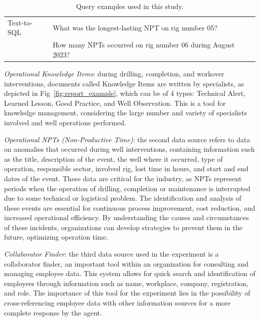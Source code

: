 \begin{table}[h]
\begin{tabular}{|p{2cm}|l|}
                    Text-to-SQL & What was the longest-lasting NPT on rig number 05? \\ 
                    & How many NPTs occurred on rig number 06 during August 2023? \\ 
                    \hline
                \end{tabular}
                \fussy
                \caption{Query examples used in this study. }
                \label{table:question_examples}
            \end{table}

            \emph{Operational Knowledge Items}: during drilling, completion, and workover interventions, documents called Knowledge Items are written by specialists, as depicted in Fig~\ref{fig:report_example}, which can be of 4 types: Technical Alert, Learned Lesson, Good Practice, and Well Observation. 
            This is a tool for knowledge management, considering the large number and variety of specialists involved and well operations performed.
            
            \emph{Operational NPTs (Non-Productive Time)}: the second data source refers to data on anomalies that occurred during well interventions, containing information such as the title, description of the event, the well where it occurred, type of operation, responsible sector, involved rig, lost time in hours, and start and end dates of the event. 
            These data are critical for the industry, as NPTs represent periods when the operation of drilling, completion or maintenance is interrupted due to some technical or logistical problem. The identification and analysis of these events are essential for continuous process improvement, cost reduction, and increased operational efficiency. By understanding the causes and circumstances of these incidents, organizations can develop strategies to prevent them in the future, optimizing operation time.
            
            \emph{Collaborator Finder}: the third data source used in the experiment is a collaborator finder, an important tool within an organization for consulting and managing employee data. 
            This system allows for quick search and identification of employees through information such as name, workplace, company, registration, and role. The importance of this tool for the experiment lies in the possibility of cross-referencing employee data with other information sources for a more complete response by the agent.
            
